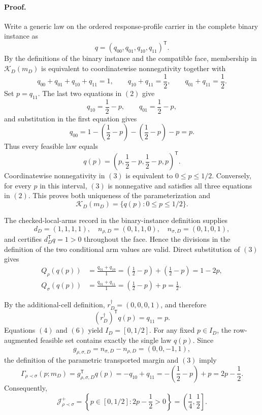\paragraph{Proof.}
Write a generic law on the ordered response-profile carrier in the complete binary instance as
\[
q=(q_{00},q_{01},q_{10},q_{11})^{\mathsf T}.
\]
By the definitions of the binary instance and the compatible face, membership in \(\mathcal K_D(m_D)\) is equivalent to coordinatewise nonnegativity together with
\[
q_{00}+q_{01}+q_{10}+q_{11}=1,
\qquad
q_{10}+q_{11}=\frac12,
\qquad
q_{01}+q_{11}=\frac12.
\tag{2}
\]
Set \(p=q_{11}\).  The last two equations in \((2)\) give
\[
q_{10}=\frac12-p,
\qquad
q_{01}=\frac12-p,
\]
and substitution in the first equation gives
\[
q_{00}
=1-\left(\frac12-p\right)-\left(\frac12-p\right)-p
=p.
\]
Thus every feasible law equals
\[
q(p)=\left(p,\frac12-p,\frac12-p,p\right)^{\mathsf T}.
\tag{3}
\]
Coordinatewise nonnegativity in \((3)\) is equivalent to \(0\leq p\leq 1/2\).  Conversely, for every \(p\) in this interval, \((3)\) is nonnegative and satisfies all three equations in \((2)\).  This proves both uniqueness of the parameterization and
\[
\mathcal K_D(m_D)=\{q(p):0\leq p\leq1/2\}.
\tag{4}
\]

The checked-local-arms record in the binary-instance definition supplies
\[
d_D=(1,1,1,1),
\quad
n_{\rho,D}=(0,1,1,0),
\quad
n_{\sigma,D}=(0,1,0,1),
\]
and certifies \(d_D^{\mathsf T}q=1>0\) throughout the face.  Hence the divisions in the definition of the two conditional arm values are valid.  Direct substitution of \((3)\) gives
\[
\begin{aligned}
Q_\rho(q(p))
&=\frac{q_{01}+q_{10}}{1}
=\left(\frac12-p\right)+\left(\frac12-p\right)
=1-2p,\\
Q_\sigma(q(p))
&=\frac{q_{01}+q_{11}}{1}
=\left(\frac12-p\right)+p
=\frac12.
\end{aligned}
\tag{5}
\]

By the additional-cell definition, \(r_D^\dagger=(0,0,0,1)\), and therefore
\[
(r_D^\dagger)^{\mathsf T}q(p)=q_{11}=p.
\tag{6}
\]
Equations \((4)\) and \((6)\) yield \(I_D=[0,1/2]\).  For any fixed \(p\in I_D\), the row-augmented feasible set contains exactly the single law \(q(p)\).  Since
\[
g_{\rho,\sigma,D}=n_{\sigma,D}-n_{\rho,D}=(0,0,-1,1),
\]
the definition of the parametric transported margin and \((3)\) imply
\[
\Gamma_{\rho\prec\sigma}(p;m_D)
=g_{\rho,\sigma,D}^{\mathsf T}q(p)
=-q_{10}+q_{11}
=-\left(\frac12-p\right)+p
=2p-\frac12.
\tag{7}
\]
Consequently,
\[
\mathcal J_{\rho\prec\sigma}^+
=\left\{p\in[0,1/2]:2p-\frac12>0\right\}
=\left(\frac14,\frac12\right].
\tag{8}
\]

